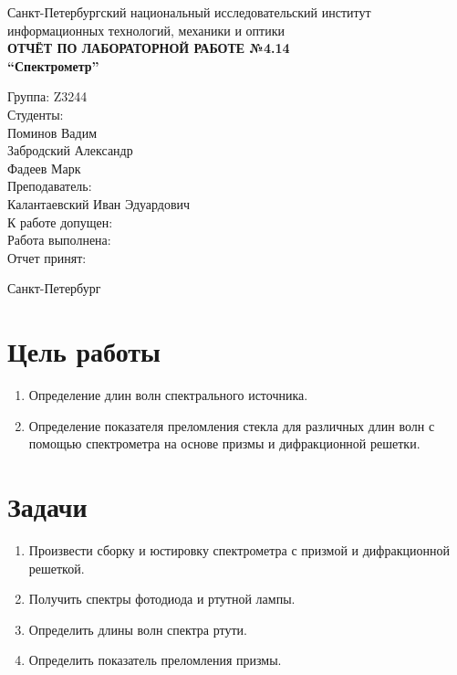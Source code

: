 \documentclass[a4paper,12pt]{article}
\begin{document}
\begin{titlepage}
    \centering
    Санкт-Петербургский национальный исследовательский институт\\
    информационных технологий, механики и оптики\\[2.0cm]

    {\Large \textbf{ОТЧЁТ ПО ЛАБОРАТОРНОЙ РАБОТЕ №4.14}}\\[0.5cm]
    {\Large \textbf{``Спектрометр''}}\\[2.0cm]

    \begin{flushleft}
    Группа: Z3244\\[0.3cm]
    Студенты:\\
    Поминов Вадим\\
    Забродский Александр\\
    Фадеев Марк\\[0.5cm]
    Преподаватель:\\
    Калантаевский Иван Эдуардович\\[1.0cm]
    К работе допущен:\\[0.3cm]
    Работа выполнена:\\[0.3cm]
    Отчет принят:
    \end{flushleft}

    \vfill
    Санкт-Петербург\\
    \the\year
\end{titlepage}

\section{Цель работы}

\begin{enumerate}[label=\arabic*.]
    \item Определение длин волн спектрального источника.
    \item Определение показателя преломления стекла для различных длин волн с помощью спектрометра на основе призмы и дифракционной решетки.
\end{enumerate}

\section{Задачи}

\begin{enumerate}[label=\arabic*.]
    \item Произвести сборку и юстировку спектрометра с призмой и дифракционной решеткой.
    \item Получить спектры фотодиода и ртутной лампы.
    \item Определить длины волн спектра ртути.
    \item Определить показатель преломления призмы.
\end{enumerate}
\end{document}

